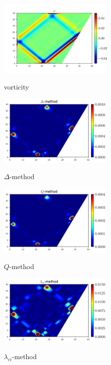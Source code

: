 \documentclass[a4wide,fontsize=12pt]{article}
\begin{document}
\begin{figure}
\begin{multicols}{2}
    \centering
    \includegraphics[width=0.5\textwidth]{Figs/VortexRot.png}
    \caption{vorticity}
    \label{fig:vorticity}
    \hfill
    \includegraphics[width=0.5\textwidth]{Figs/VortexDelta.png}
    \caption{$\Delta$-method}
    \label{fig:Delta}
\end{multicols}
\end{figure}

\begin{figure}
\begin{multicols}{2}
    \centering
    \includegraphics[width=0.5\textwidth]{Figs/VortexQ.png}
    \caption{$Q$-method}
    \label{fig:Q}
    \hfill
    \includegraphics[width=0.5\textwidth]{Figs/VortexLambdaCi.png}
    \caption{$\lambda_{ci}$-method}
    \label{fig:Lci}
    \end{multicols}
\end{figure}
\end{document}
